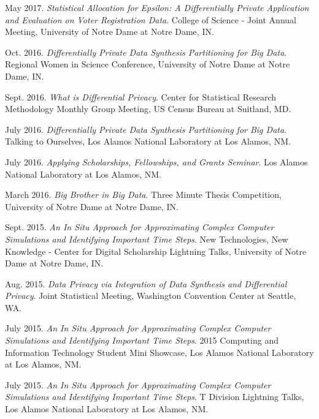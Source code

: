 \documentclass[11pt, letterpaper, roman]{moderncv} %
\begin{document}
\begin{etaremune}[topsep=0pt, itemsep=5pt, partopsep=0pt, parsep=0pt]
  \item May 2017. \textit{Statistical Allocation for Epsilon: A Differentially Private Application and Evaluation on Voter Registration Data}. College of Science - Joint Annual Meeting, University of Notre Dame at Notre Dame, IN.

  \item Oct. 2016. \textit{Differentially Private Data Synthesis Partitioning for Big Data}. Regional Women in Science Conference, University of Notre Dame at Notre Dame, IN. 

  \item Sept. 2016. \textit{What is Differential Privacy}. Center for Statistical Research Methodology Monthly Group Meeting, US Census Bureau at Suitland, MD. 

  \item July 2016. \textit{Differentially Private Data Synthesis Partitioning for Big Data}. Talking to Ourselves, Los Alamos National Laboratory at Los Alamos, NM.
  
  \item July 2016. \textit{Applying Scholarships, Fellowships, and Grants Seminar}. Los Alamos National Laboratory at Los Alamos, NM.
  
  \item March 2016. \textit{Big Brother in Big Data}. Three Minute Thesis Competition, University of Notre Dame at Notre Dame, IN.

  \item Sept. 2015. \textit{An In Situ Approach for Approximating Complex Computer Simulations and Identifying Important Time Steps}. New Technologies, New Knowledge - Center for Digital Scholarship Lightning Talks, University of Notre Dame at Notre Dame, IN.

  \item Aug. 2015. \textit{Data Privacy via Integration of Data Synthesis and Differential Privacy}. Joint Statistical Meeting, Washington Convention Center at Seattle, WA.

  \item July 2015. \textit{An In Situ Approach for Approximating Complex Computer Simulations and Identifying Important Time Steps}. 2015 Computing and Information Technology Student Mini Showcase, Los Alamos National Laboratory at Los Alamos, NM.

  \item July 2015. \textit{An In Situ Approach for Approximating Complex Computer Simulations and Identifying Important Time Steps}. T Division Lightning Talks, Los Alamos National Laboratory at Los Alamos, NM.
  

\end{etaremune}
\end{document}
